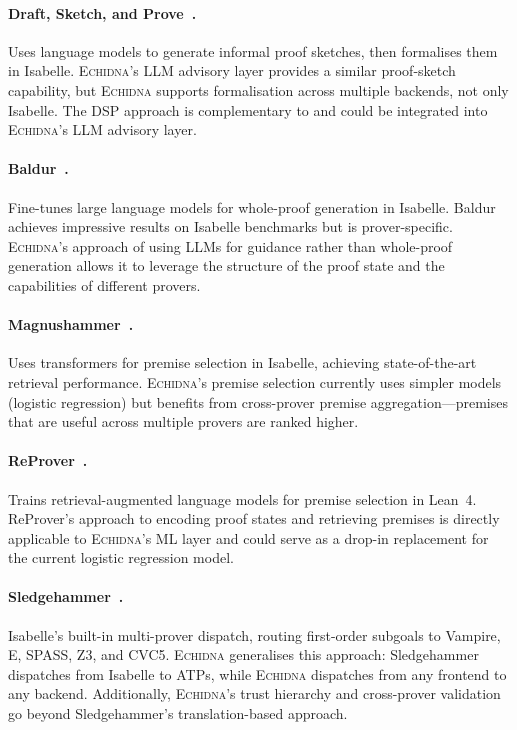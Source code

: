 \documentclass[11pt,a4paper]{article}
\newcommand{\echidna}{\textsc{Echidna}}
\begin{document}
\paragraph{Draft, Sketch, and Prove~\citep{dsp}.}
Uses language models to generate informal proof sketches, then formalises them
in Isabelle. \echidna{}'s LLM advisory layer provides a similar proof-sketch
capability, but \echidna{} supports formalisation across multiple backends, not
only Isabelle. The DSP approach is complementary to and could be integrated
into \echidna{}'s LLM advisory layer.

\paragraph{Baldur~\citep{baldur}.}
Fine-tunes large language models for whole-proof generation in Isabelle.
Baldur achieves impressive results on Isabelle benchmarks but is prover-specific.
\echidna{}'s approach of using LLMs for guidance rather than whole-proof
generation allows it to leverage the structure of the proof state and the
capabilities of different provers.

\paragraph{Magnushammer~\citep{magnushammer}.}
Uses transformers for premise selection in Isabelle, achieving state-of-the-art
retrieval performance. \echidna{}'s premise selection currently uses simpler
models (logistic regression) but benefits from cross-prover premise
aggregation---premises that are useful across multiple provers are ranked
higher.

\paragraph{ReProver~\citep{reprover}.}
Trains retrieval-augmented language models for premise selection in Lean~4.
ReProver's approach to encoding proof states and retrieving premises is
directly applicable to \echidna{}'s ML layer and could serve as a drop-in
replacement for the current logistic regression model.

\paragraph{Sledgehammer~\citep{sledgehammer}.}
Isabelle's built-in multi-prover dispatch, routing first-order subgoals to
Vampire, E, SPASS, Z3, and CVC5. \echidna{} generalises this approach:
Sledgehammer dispatches from Isabelle to ATPs, while \echidna{} dispatches
from any frontend to any backend. Additionally, \echidna{}'s trust hierarchy
and cross-prover validation go beyond Sledgehammer's translation-based approach.
\end{document}
